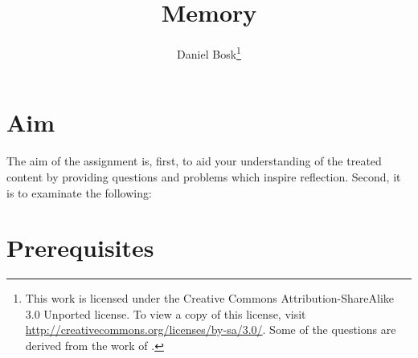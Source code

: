 \documentclass[a4paper]{miunasgn}
\title{Memory}
\author{Daniel Bosk\footnote{%
	This work is licensed under the Creative Commons Attribution-ShareAlike 3.0 
	Unported license.
	To view a copy of this license, visit 
	\url{http://creativecommons.org/licenses/by-sa/3.0/}.
	Some of the questions are derived from the work of 
	\citeauthor*{Silberschatz2009osc}.
}}
\date{\svnId}
\begin{document}
\maketitle
\thispagestyle{foot}
\tableofcontents


\section{Aim}
\label{sec:Aim}
The aim of the assignment is, first, to aid your understanding of the treated 
content by providing questions and problems which inspire reflection.
Second, it is to examinate the following:
\begin{itemize}
	
\end{itemize}


\section{Prerequisites}
\label{sec:Prerequisites}

\end{document}
